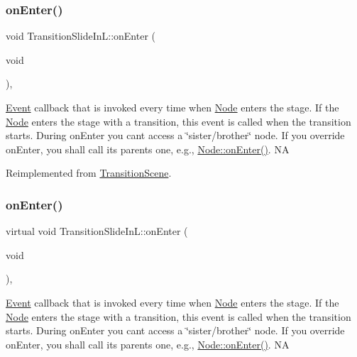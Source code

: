 \subsubsection{\texorpdfstring{on\+Enter()}{onEnter()}\hspace{0.1cm}{\footnotesize\ttfamily [1/2]}}
{\footnotesize\ttfamily void Transition\+Slide\+In\+L\+::on\+Enter (\begin{DoxyParamCaption}\item[{void}]{ }\end{DoxyParamCaption})\hspace{0.3cm}{\ttfamily [override]}, {\ttfamily [virtual]}}

\hyperlink{classEvent}{Event} callback that is invoked every time when \hyperlink{classNode}{Node} enters the \textquotesingle{}stage\textquotesingle{}. If the \hyperlink{classNode}{Node} enters the \textquotesingle{}stage\textquotesingle{} with a transition, this event is called when the transition starts. During on\+Enter you can\textquotesingle{}t access a \char`\"{}sister/brother\char`\"{} node. If you override on\+Enter, you shall call its parent\textquotesingle{}s one, e.\+g., \hyperlink{classNode_a7f51764c4afd5018a052b9ef71c03374}{Node\+::on\+Enter()}.  NA 

Reimplemented from \hyperlink{classTransitionScene_aace390a1bd8f3c73bb650a1e256a0f83}{Transition\+Scene}.

\mbox{\label{classTransitionSlideInL_a73601109845268099d90b12808de6b40}} 
\subsubsection{\texorpdfstring{on\+Enter()}{onEnter()}\hspace{0.1cm}{\footnotesize\ttfamily [2/2]}}
{\footnotesize\ttfamily virtual void Transition\+Slide\+In\+L\+::on\+Enter (\begin{DoxyParamCaption}\item[{void}]{ }\end{DoxyParamCaption})\hspace{0.3cm}{\ttfamily [override]}, {\ttfamily [virtual]}}

\hyperlink{classEvent}{Event} callback that is invoked every time when \hyperlink{classNode}{Node} enters the \textquotesingle{}stage\textquotesingle{}. If the \hyperlink{classNode}{Node} enters the \textquotesingle{}stage\textquotesingle{} with a transition, this event is called when the transition starts. During on\+Enter you can\textquotesingle{}t access a \char`\"{}sister/brother\char`\"{} node. If you override on\+Enter, you shall call its parent\textquotesingle{}s one, e.\+g., \hyperlink{classNode_a7f51764c4afd5018a052b9ef71c03374}{Node\+::on\+Enter()}.  NA 

